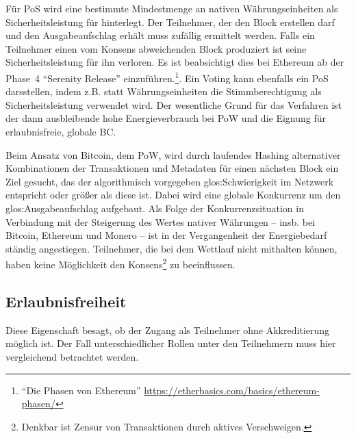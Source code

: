 Für \gls{PoS} wird eine bestimmte Mindestmenge an nativen Währungseinheiten als Sicherheitsleistung für hinterlegt. Der Teilnehmer, der den Block erstellen darf und den Ausgabeaufschlag erhält muss zufällig ermittelt werden. Falls ein Teilnehmer einen vom Konsens abweichenden Block produziert ist seine Sicherheitsleistung für ihn verloren. Es ist beabsichtigt dies bei Ethereum ab der Phase~4 \enquote{Serenity Release} einzuführen.\footnote{\enquote{Die Phasen von Ethereum} \url{https://etherbasics.com/basics/ethereum-phasen/}}. Ein Voting kann ebenfalls ein \gls{PoS} darsstellen, indem z.B. statt Währungseinheiten die Stimmberechtigung als Sicherheitsleistung verwendet wird. Der wesentliche Grund für das Verfahren ist der dann ausbleibende hohe Energieverbrauch bei \gls{PoW} und die Eignung für erlaubnisfreie, globale \gls{BC}.

Beim Ansatz von Bitcoin, dem \gls{PoW}, wird durch laufendes Hashing alternativer Kombinationen der Transaktionen und Metadaten für einen nächsten Block ein Ziel gesucht, das der algorithmisch vorgegeben \gls{glos:Schwierigkeit} im Netzwerk entspricht oder größer als diese ist. Dabei wird eine globale Konkurrenz um den \gls{glos:Ausgabeaufschlag} aufgebaut. Als Folge der Konkurrenzsituation in Verbindung mit der Steigerung des Wertes nativer Währungen -- insb. bei Bitcoin, Ethereum und Monero -- ist in der Vergangenheit der Energiebedarf ständig angestiegen. Teilnehmer, die bei dem Wettlauf nicht mithalten können, haben keine Möglichkeit den Konsens\footnote{Denkbar ist Zensur von Transaktionen durch aktives Verschweigen.} zu beeinflussen.

\subsection{Erlaubnisfreiheit}\label{krit:erlaubnisfreiheit}

Diese Eigenschaft besagt, ob der Zugang als Teilnehmer ohne Akkreditierung möglich ist.
Der Fall unterschiedlicher Rollen unter den Teilnehmern muss hier vergleichend betrachtet werden.



